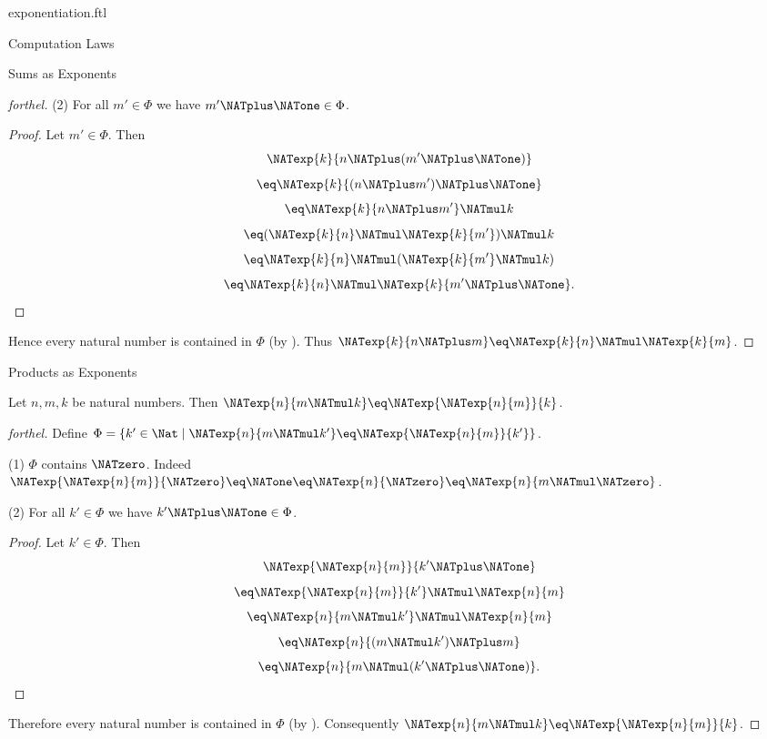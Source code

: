 \documentclass{naproche-library}
\begin{document}
\begin{smodule}[title=Exponentiation]{exponentiation.ftl}
\begin{sfragment}{Computation Laws}
\begin{sfragment}{Sums as Exponents}
\begin{proof}[forthel]
      (2) For all $m' \in \Phi$ we have $m' \NATplus \NATone \in \Phi$.
      \begin{proof}
        Let $m' \in \Phi$.
        Then
        \[  \NATexp{k}{n \NATplus (m' \NATplus \NATone)}                  \]
        \[    \eq \NATexp{k}{(n \NATplus m') \NATplus \NATone}              \]
        \[    \eq \NATexp{k}{n \NATplus m'} \NATmul k            \]
        \[    \eq (\NATexp{k}{n} \NATmul \NATexp{k}{m'}) \NATmul k  \]
        \[    \eq \NATexp{k}{n} \NATmul (\NATexp{k}{m'} \NATmul k)  \]
        \[    \eq \NATexp{k}{n} \NATmul \NATexp{k}{m' \NATplus \NATone}.       \]
      \end{proof}

      Hence every natural number is contained in $\Phi$ (by ).
      Thus $\NATexp{k}{n \NATplus m} \eq \NATexp{k}{n} \NATmul \NATexp{k}{m}$.
    \end{proof}
  \end{sfragment}

  \begin{sfragment}{Products as Exponents}
    \begin{proposition}[forthel,id=ARITHMETIC_09_7827956571308032]
      Let $n, m, k$ be natural numbers.
      Then $\NATexp{n}{m \NATmul k} \eq \NATexp{\NATexp{n}{m}}{k}$.
    \end{proposition}
    \begin{proof}[forthel]
      Define $\Phi = \{ k' \in \Nat \mid \NATexp{n}{m \NATmul k'} \eq \NATexp{\NATexp{n}{m}}{k'} \}$.

      (1) $\Phi$ contains $\NATzero$.
      Indeed $\NATexp{\NATexp{n}{m}}{\NATzero}
        \eq \NATone
        \eq \NATexp{n}{\NATzero}
        \eq \NATexp{n}{m \NATmul \NATzero}$.

      (2) For all $k' \in \Phi$ we have $k' \NATplus \NATone \in \Phi$.
      \begin{proof}
        Let $k' \in \Phi$.
        Then
        \[  \NATexp{\NATexp{n}{m}}{k' \NATplus \NATone}                \]
        \[    \eq \NATexp{\NATexp{n}{m}}{k'} \NATmul \NATexp{n}{m}    \]
        \[    \eq \NATexp{n}{m \NATmul k'} \NATmul \NATexp{n}{m}  \]
        \[    \eq \NATexp{n}{(m \NATmul k') \NATplus m}        \]
        \[    \eq \NATexp{n}{m \NATmul (k' \NATplus \NATone)}.       \]
      \end{proof}

      Therefore every natural number is contained in $\Phi$ (by ).
      Consequently $\NATexp{n}{m \NATmul k} \eq \NATexp{\NATexp{n}{m}}{k}$.
    \end{proof}
  \end{sfragment}


\end{sfragment}
\end{smodule}
\end{document}
